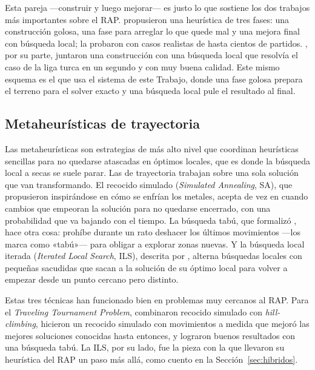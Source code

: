 \documentclass[11pt,a4paper,spanish]{book}
\numberwithin{equation}{chapter}
\numberwithin{figure}{chapter}
\numberwithin{table}{chapter}
\begin{document}
Esta pareja —construir y luego mejorar— es justo lo que sostiene los dos trabajos más importantes sobre el RAP.  propusieron una heurística de tres fases: una construcción golosa, una fase para arreglar lo que quede mal y una mejora final con búsqueda local; la probaron con casos realistas de hasta cientos de partidos. , por su parte, juntaron una construcción con una búsqueda local que resolvía el caso de la liga turca en un segundo y con muy buena calidad. Este mismo esquema es el que usa el sistema de este Trabajo, donde una fase golosa prepara el terreno para el solver exacto y una búsqueda local pule el resultado al final.

\subsection{Metaheurísticas de trayectoria}

Las metaheurísticas son estrategias de más alto nivel que coordinan heurísticas sencillas para no quedarse atascadas en óptimos locales, que es donde la búsqueda local a secas se suele parar. Las de trayectoria trabajan sobre una sola solución que van transformando. El recocido simulado (\emph{Simulated Annealing}, SA), que propusieron  inspirándose en cómo se enfrían los metales, acepta de vez en cuando cambios que empeoran la solución para no quedarse encerrado, con una probabilidad que va bajando con el tiempo. La búsqueda tabú, que formalizó , hace otra cosa: prohíbe durante un rato deshacer los últimos movimientos —los marca como «tabú»— para obligar a explorar zonas nuevas. Y la búsqueda local iterada (\emph{Iterated Local Search}, ILS), descrita por , alterna búsquedas locales con pequeñas sacudidas que sacan a la solución de su óptimo local para volver a empezar desde un punto cercano pero distinto.

Estas tres técnicas han funcionado bien en problemas muy cercanos al RAP. Para el \emph{Traveling Tournament Problem},  combinaron recocido simulado con \emph{hill-climbing},  hicieron un recocido simulado con movimientos a medida que mejoró las mejores soluciones conocidas hasta entonces, y  lograron buenos resultados con una búsqueda tabú. La ILS, por su lado, fue la pieza con la que  llevaron su heurística del RAP un paso más allá, como cuento en la Sección~\ref{sec:hibridos}.
\end{document}
